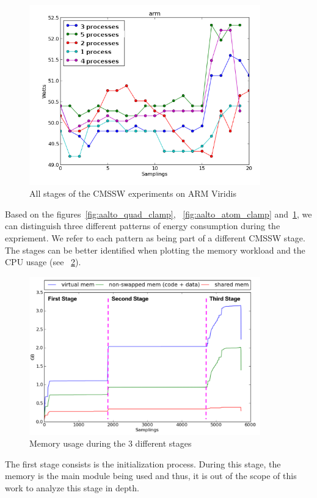 \begin{figure}[h]
  \centering
    \includegraphics[width=100mm]{"img/aalto/aalto_total_arm"}
    \caption{All stages of the CMSSW experiments on ARM Viridis}
    \label{fig:aalto_arm_clamp}
\end{figure}

Based on the figures~\ref{fig:aalto_quad_clamp}, ~\ref{fig:aalto_atom_clamp} 
and~\ref{fig:aalto_arm_clamp}, we can distinguish three different patterns of energy consumption during the expriement. 
We refer to each pattern as being part of a different CMSSW stage. The stages can be better identified 
when plotting the memory workload and the CPU usage (see ~\ref{fig:memory_stages}).

\begin{figure}[h]
  \centering
    \includegraphics[width=100mm]{"img/aalto/memory_stages"}
    \caption{Memory usage during the 3 different stages}
    \label{fig:memory_stages}
\end{figure}

The first stage consists is the initialization process. During this stage, the memory is the main module being used and thus, it is out of the scope of this work to analyze this stage in depth. 

